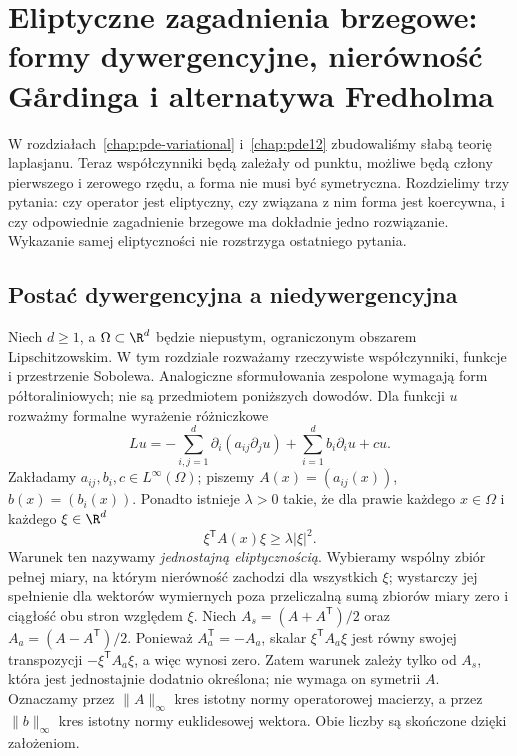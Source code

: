 \chapter[Eliptyczne zagadnienia brzegowe]{Eliptyczne zagadnienia brzegowe: formy dywergencyjne, nierówność Gårdinga i alternatywa Fredholma}
\label{chap:pde13}

W rozdziałach~\ref{chap:pde-variational} i~\ref{chap:pde12} zbudowaliśmy
słabą teorię laplasjanu. Teraz współczynniki będą zależały od punktu,
możliwe będą człony pierwszego i zerowego rzędu, a forma nie musi być
symetryczna. Rozdzielimy trzy pytania: czy operator jest eliptyczny,
czy związana z nim forma jest koercywna, i czy odpowiednie zagadnienie
brzegowe ma dokładnie jedno rozwiązanie. Wykazanie samej eliptyczności
nie rozstrzyga ostatniego pytania.

\section{Postać dywergencyjna a niedywergencyjna}
\label{sec:pde13-operators}
Niech $d\geq1$, a $\Omega\subset\R^d$ będzie niepustym,
ograniczonym obszarem Lipschitzowskim. W tym rozdziale
rozważamy rzeczywiste współczynniki, funkcje i przestrzenie
Sobolewa. Analogiczne sformułowania zespolone wymagają
form półtoraliniowych; nie są przedmiotem poniższych dowodów.
Dla funkcji $u$ rozważmy formalne wyrażenie różniczkowe
\begin{equation}\label{eq:pde13-div}
 Lu=-\sum_{i,j=1}^d\partial_i(a_{ij}\partial_j u)
       +\sum_{i=1}^d b_i\partial_i u+cu.
\end{equation}
Zakładamy $a_{ij},b_i,c\in L^\infty(\Omega)$; piszemy
$A(x)=(a_{ij}(x))$, $b(x)=(b_i(x))$. Ponadto istnieje $\lambda>0$
takie, że dla prawie każdego $x\in\Omega$ i każdego $\xi\in\R^d$
\begin{equation}\label{eq:pde13-elliptic}
 \xi^{\mathsf T}A(x)\xi\geq\lambda|\xi|^2.
\end{equation}
Warunek ten nazywamy \emph{jednostajną eliptycznością}.
Wybieramy wspólny zbiór pełnej miary, na którym nierówność
zachodzi dla wszystkich $\xi$; wystarczy jej spełnienie dla
wektorów wymiernych poza przeliczalną sumą zbiorów miary zero
i ciągłość obu stron względem $\xi$.
Niech $A_s=(A+A^{\mathsf T})/2$ oraz
$A_a=(A-A^{\mathsf T})/2$. Ponieważ $A_a^{\mathsf T}=-A_a$,
skalar $\xi^{\mathsf T}A_a\xi$ jest równy swojej transpozycji
$-\xi^{\mathsf T}A_a\xi$, a więc wynosi zero.
Zatem warunek zależy tylko od $A_s$, która jest jednostajnie
dodatnio określona; nie wymaga on symetrii $A$.
Oznaczamy przez $\|A\|_\infty$ kres istotny normy operatorowej
macierzy, a przez $\|b\|_\infty$ kres istotny normy euklidesowej
wektora. Obie liczby są skończone dzięki założeniom.

